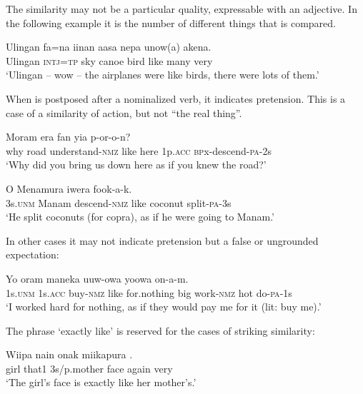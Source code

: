 The similarity may not be a particular quality, expressable with an adjective. In the following example it is the number of different things that is compared.

\ea%
\label{ex:x1342}
\gll Ulingan  fa=na  iinan  aasa  nepa    unow(a)  akena. \\
Ulingan  \textsc{intj}=\textsc{tp}  sky  canoe  bird  like  many  very\\
\glt `Ulingan -- wow -- the airplanes were like birds, there were lots of them.'
\z

When  is postposed after a nominalized verb, it indicates pretension. This is a case of a similarity of action, but not ``the real thing''.

\ea%
\label{ex:x1343}
\gll Moram  era      fan  yia p-or-o-n?\\
why  road  understand-\textsc{nmz}  like  here  1p.\textsc{acc} \textsc{bp}x-descend-\textsc{pa}-2s\\
\glt `Why did you bring us down here as if you knew the road?'
\z

\ea%
\label{ex:x1344}
\gll O  Menamura      iwera  fook-a-k. \\
3s.\textsc{unm}  Manam  descend-\textsc{nmz}  like  coconut  split-\textsc{pa}-3s\\
\glt `He split coconuts (for copra), as if he were going to Manam.'
\z

In other cases it may not indicate pretension but a false or ungrounded expectation: 

\ea%
\label{ex:x1345}
\gll Yo        oram  maneka uuw-owa  yoowa  on-a-m. \\
1s.\textsc{unm}  1s.\textsc{acc}  buy-\textsc{nmz}  like  for.nothing  big work-\textsc{nmz}  hot  do-\textsc{pa}-1s\\
\glt `I worked hard for nothing, as if they would pay me for it (lit: buy me).'
\z

The phrase   `exactly like' is reserved for the cases of striking similarity: 

\ea%
\label{ex:x1346}
\gll Wiipa  nain  onak  miikapura    . \\
girl  that1  3s/p.mother  face  again  very\\
\glt `The girl's face is exactly like her mother's.'
\z

